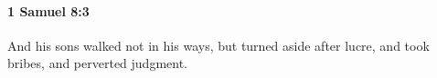 
		\paragraph{1 Samuel 8:3} %
			\label{1SAMUEL-8-3}

			And his sons walked not in his ways, but turned aside after lucre, and took bribes, and perverted judgment.


